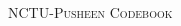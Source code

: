 \documentclass[a4paper,10pt,oneside]{article}
\begin{document}
  \begin{multicols}{3}
  \pagestyle{fancy}

  \fancyfoot{}
  \fancyhead[R]{\thepage}

  \renewcommand{\headrulewidth}{0.4pt}
  \renewcommand{\contentsname}{Contents}


  \scriptsize
  
  \clearpage
  \end{multicols}
  \newpage
  \begin{multicols}{3}
  \enlargethispage*{\baselineskip}
  \begin{center}
    \Huge\textsc{NCTU-Pusheen Codebook}
    \vspace{0.35cm}
  \end{center}
  \tableofcontents
  \end{multicols}
  \clearpage
\end{document}
